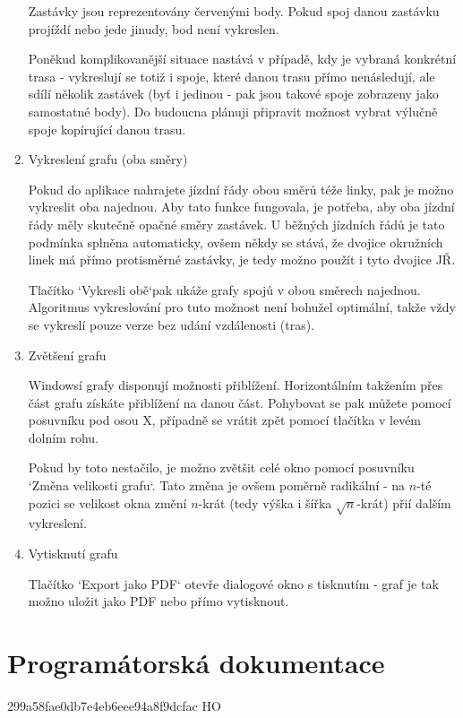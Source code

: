 \documentclass[14pt]{article}
\begin{document}
\begin{enumerate}
Zastávky jsou reprezentovány červenými body. Pokud spoj danou zastávku projíždí nebo jede jinudy, bod není vykreslen.

 Poněkud komplikovanější situace nastává v případě, kdy je vybraná konkrétní trasa - vykreslují se totiž i spoje, které danou trasu přímo nenásledují, ale sdílí několik zastávek (byť i jedinou - pak jsou takové spoje zobrazeny jako samostatné body). Do budoucna plánuji připravit možnost vybrat výlučně spoje kopírující danou trasu.

\item Vykreslení grafu (oba směry)

Pokud do aplikace nahrajete jízdní řády obou směrů téže linky, pak je možno vykreslit oba najednou. Aby tato funkce fungovala, je potřeba, aby oba jízdní řády měly skutečně opačné směry zastávek. U běžných jízdních řádů je tato podmínka splněna automaticky, ovšem někdy se stává, že dvojice okružních linek má přímo protisměrné zastávky, je tedy možno použít i tyto dvojice JŘ.

Tlačítko `Vykresli obě`pak ukáže grafy spojů v obou směrech najednou. Algoritmus vykreslování pro tuto možnost není bohužel optimální, takže vždy se vykreslí pouze verze bez udání vzdálenosti (tras).

\item Zvětšení grafu

Windowsí grafy disponují možnosti přiblížení. Horizontálním takžením přes část grafu získáte přiblížení na danou část. Pohybovat se pak můžete pomocí posuvníku pod osou X, případně se vrátit zpět pomocí tlačítka v levém dolním rohu.

Pokud by toto nestačilo, je možno zvětšit celé okno pomocí posuvníku `Změna velikosti grafu`. Tato změna je ovšem poměrně radikální - na $n$-té pozici se velikost okna změní $n$-krát (tedy výška i šířka $\sqrt{n}$-krát) přií dalším vykreslení.

\item Vytisknutí grafu

Tlačítko `Export jako PDF` otevře dialogové okno s tisknutím - graf je tak možno uložit jako PDF nebo přímo vytisknout.
\end{enumerate}

\section{Programátorská dokumentace}
299a58fae0db7e4eb6eee94a8f9dcfac HO
\end{document}
